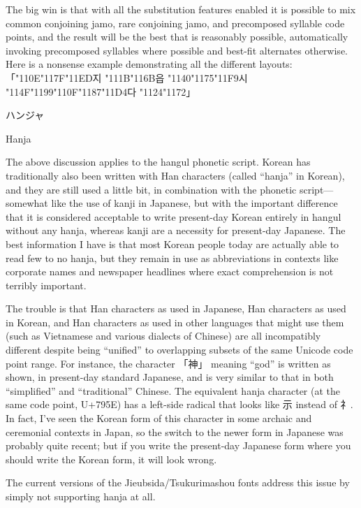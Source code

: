 \documentclass[14pt]{extarticle}
\newcommand{\blsubsection}[2]{%
\kaku\large#1\qquad\phantomsection%
\addcontentsline{toc}{subsection}{#1 #2}%
#2\par\addpenalty{-300}\normalsize}
\begin{document}
The big win is that with all the substitution
features enabled it is possible to mix common conjoining jamo,
rare conjoining jamo, and precomposed syllable code points, and the result
will be the best that is reasonably possible, automatically invoking
precomposed syllables where possible and best-fit alternates otherwise. 
Here is a nonsense example demonstrating all the different layouts:
{\dodum%
「\char"110E\char"117F\char"11ED지%
\char"111B\char"116B읍%
\char"1140\char"1175\char"11F9시%
\char"114F\char"1199\char"110F\char"1187\char"11D4다%
\char"1124\char"1172」}


\blsubsection{ハンジャ}{Hanja}

The above discussion applies to the hangul phonetic script.  Korean has
traditionally also been written with Han characters (called ``hanja'' in
Korean), and they are still used a little bit, in combination with the
phonetic script---somewhat like the use of kanji in Japanese, but with the
important difference that it is considered acceptable to write present-day
Korean entirely in hangul without any hanja, whereas kanji are a necessity
for present-day Japanese.  The best information I have is that most Korean
people today are actually able to read few to no hanja, but they remain in
use as abbreviations in contexts like corporate names and newspaper
headlines where exact comprehension is not terribly important.

The trouble is that Han characters as used in Japanese, Han characters as
used in Korean, and Han characters as used in other languages that might use
them (such as Vietnamese and various dialects of Chinese) are all
incompatibly different despite being ``unified'' to overlapping subsets of
the same Unicode code point range.  For instance, the character 「神」
meaning ``god'' is written as shown, in present-day standard Japanese, and is
very similar to that in both ``simplified'' and ``traditional'' Chinese.
The equivalent hanja character (at the same code point, U+795E) has a
left-side radical that looks like 示 instead of 礻.  In fact, I've seen the
Korean form of this character in some archaic and ceremonial contexts in
Japan, so the switch to the newer form in Japanese was probably quite
recent; but if you write the present-day Japanese form where you should
write the Korean form, it will look wrong.

The current versions of the Jieubsida/Tsukurimashou fonts address this issue
by simply not supporting hanja at all.
\end{document}
